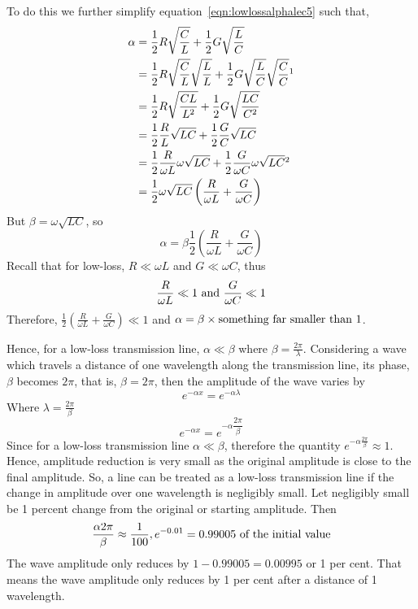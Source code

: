 To do this we further simplify equation~\eqref{eqn:lowlossalphalec5} such that,
\begin{align*}
\alpha &=\frac{1}{2}R\sqrt{\frac{C}{L}} + \frac{1}{2}G\sqrt{\frac{L}{C}}\\	
&= \frac{1}{2} R \sqrt{\frac{C}{L}} \sqrt{\frac{L}{L}} + \frac{1}{2} G \sqrt{\frac{L}{C}} \sqrt{\frac{C}{C}}\footnotemark\\
&= \frac{1}{2} R \sqrt{\frac{CL}{L^2}} + \frac{1}{2} G \sqrt{\frac{LC}{C^2}}\\
&= \frac{1}{2} \frac{R}{L} \sqrt{LC} + \frac{1}{2} \frac{G}{C} \sqrt{LC}\\
&= \frac{1}{2} \frac{R}{\omega L} \omega \sqrt{LC} + \frac{1}{2} \frac{G}{\omega C} \omega \sqrt{LC}\footnotemark\\
&= \frac{1}{2} \omega\sqrt{LC}\left(\frac{R}{\omega L} + \frac{G}{\omega C}\right)
\end{align*}
But $\beta = \omega \sqrt{LC}$, so
\begin{equation}
\alpha = \beta\frac{1}{2} \left(\frac{R}{\omega L} + \frac{G}{\omega C}\right)
\end{equation}
Recall that for low-loss, $R\ll\omega L$ and $G\ll\omega C$, thus
\[\frac{R}{\omega L} \ll 1\textnormal{ and }\frac{G}{\omega C} \ll 1\]
Therefore, $\frac{1}{2} \left(\frac{R}{\omega L} + \frac{G}{\omega C}\right) \ll 1$ and $\alpha = \beta \times \textnormal{something far smaller than 1}$.

Hence, for a low-loss transmission line, $\alpha \ll \beta$ where $\beta = \frac{2 \pi}{\lambda}$.
Considering a wave which travels a distance of one wavelength along the transmission line, its phase, $\beta$ becomes $2\pi$, that is, $\beta = 2 \pi$, then the amplitude of the wave varies by
\begin{equation*}
e^{-\alpha x} = e^{-\alpha\lambda}	
\end{equation*}
Where $\lambda = \frac{2\pi}{\beta}$
\begin{equation*}
e^{-\alpha x} = e^{-\alpha \dfrac{2 \pi}{\beta}}
\end{equation*}
Since for a low-loss transmission line $\alpha\ll\beta$, therefore the quantity $e^{-\alpha \frac{2 \pi}{\beta}} \approx 1$. Hence, amplitude reduction is very small as the original amplitude is close to the final amplitude. So, a line can be treated as a low-loss transmission line if the change in amplitude over one wavelength is negligibly small. Let negligibly small be 1 percent change from the original or starting amplitude. Then
\[\frac{\alpha 2 \pi}{\beta} \approx \frac{1}{100}, e^{-0.01} = 0.99005\textnormal{ of the initial value}\]
The wave amplitude only reduces by $1-0.99005=0.00995$ or 1 per cent. That means the wave amplitude only reduces by 1 per cent after a distance of 1 wavelength.

